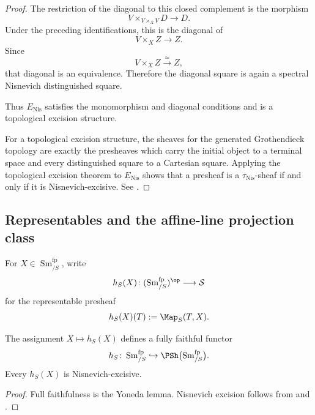 \begin{proof}
The restriction of the diagonal to this closed complement is the
morphism
\[
    V\times_{V\times_XV}D
    \longrightarrow
    D.
\]
Under the preceding identifications, this is the diagonal of
\[
    V\times_XZ
    \longrightarrow
    Z.
\]
Since
\[
    V\times_XZ
    \xrightarrow{\simeq}
    Z,
\]
that diagonal is an equivalence. Therefore the diagonal square is again
a spectral Nisnevich distinguished square.

Thus \(E_{\mathrm{Nis}}\) satisfies the monomorphism and diagonal
conditions and is a topological excision structure.

For a topological excision structure, the sheaves for the generated
Grothendieck topology are exactly the presheaves which carry the initial
object to a terminal space and every distinguished square to a Cartesian
square. Applying the topological excision theorem to
\(E_{\mathrm{Nis}}\) shows that a presheaf is a
\(\tau_{\mathrm{Nis}}\)-sheaf if and only if it is
Nisnevich-excisive. See
\cite{VoevodskyCDStructures,KhanBraveNewMotivicI}.
\end{proof}

\subsection{Representables and the affine-line projection class}

\begin{definition}
\label{def:smooth-representable-presheaf}
For $X\in\operatorname{Sm}^{\mathrm{fp}}_{/S}$, write
\[
    h_S(X)
    \colon
    (\operatorname{Sm}^{\mathrm{fp}}_{/S})^{\op}
    \longrightarrow
    \mathcal S
\]
for the representable presheaf
\[
    h_S(X)(T)
    :=
    \Map_S(T,X).
\]
\end{definition}

\begin{proposition}
\label{prop:yoneda-smooth-site}
The assignment $X\mapsto h_S(X)$ defines a fully faithful functor
\[
    h_S
    \colon
    \operatorname{Sm}^{\mathrm{fp}}_{/S}
    \hookrightarrow
    \PSh
    \bigl(
        \operatorname{Sm}^{\mathrm{fp}}_{/S}
    \bigr).
\]
Every $h_S(X)$ is Nisnevich-excisive.
\end{proposition}

\begin{proof}
Full faithfulness is the Yoneda lemma. Nisnevich excision follows from
 and
.
\end{proof}

